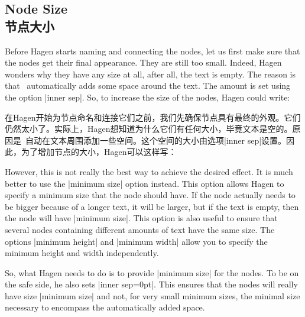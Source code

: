 
\subsection{Node Size\\节点大小}

Before Hagen starts naming and connecting the nodes, let us first make sure
that the nodes get their final appearance. They are still too small. Indeed,
Hagen wonders why they have any size at all, after all, the text is empty. The
reason is that \tikzname\ automatically adds some space around the text. The
amount is set using the option |inner sep|. So, to increase the size of the
nodes, Hagen could write:

在Hagen开始为节点命名和连接它们之前，我们先确保节点具有最终的外观。它们仍然太小了。实际上，Hagen想知道为什么它们有任何大小，毕竟文本是空的。原因是\tikzname\ 自动在文本周围添加一些空间。这个空间的大小由选项|inner sep|设置。因此，为了增加节点的大小，Hagen可以这样写：

%
\begin{codeexample}[]
\end{codeexample}

However, this is not really the best way to achieve the desired effect. It is
much better to use the |minimum size| option instead. This option allows Hagen
to specify a minimum size that the node should have. If the node actually needs
to be bigger because of a longer text, it will be larger, but if the text is
empty, then the node will have |minimum size|. This option is also useful to
ensure that several nodes containing different amounts of text have the same
size. The options |minimum height| and |minimum width| allow you to specify the
minimum height and width independently.

So, what Hagen needs to do is to provide |minimum size| for the nodes. To be on
the safe side, he also sets |inner sep=0pt|. This ensures that the nodes will
really have size |minimum size| and not, for very small minimum sizes, the
minimal size necessary to encompass the automatically added space.
%
\begin{codeexample}[]
\end{codeexample}


